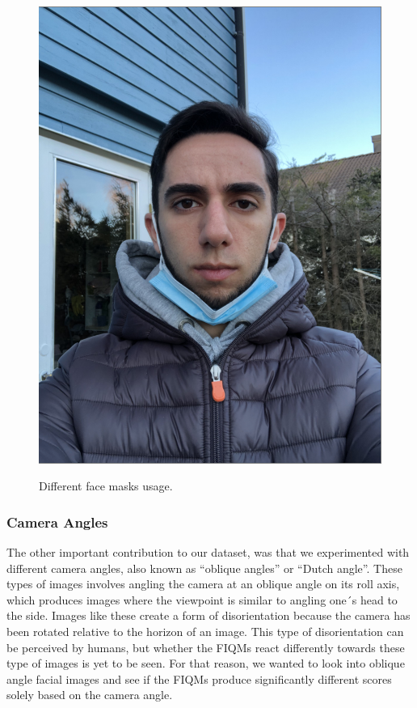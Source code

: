 \begin{figure}[h]
        {\includegraphics[scale = 0.18]{figures/1152.png}\hspace{0.0cm}}
    \caption{Different face masks usage.}
    \label{fig:masks}
\end{figure}

\subsubsection*{Camera Angles}
The other important contribution to our dataset, was that we experimented with different camera angles, also known as ``oblique angles'' or ``Dutch angle''. These types of images involves angling the camera at an oblique angle on its roll axis, which produces images where the viewpoint is similar to angling one´s head to the side. Images like these create a form of disorientation because the camera has been rotated relative to the horizon of an image. This type of disorientation can be perceived by humans, but whether the FIQMs react differently towards these type of images is yet to be seen. For that reason, we wanted to look into oblique angle facial images and see if the FIQMs produce significantly different scores solely based on the camera angle. 


